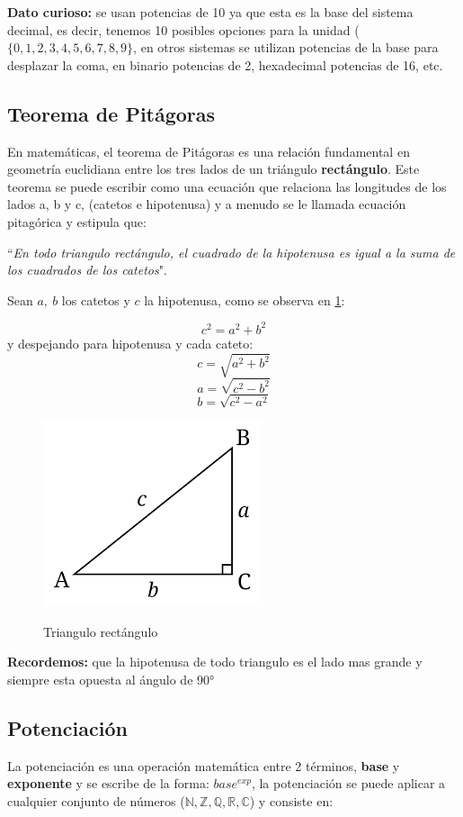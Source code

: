 \documentclass[12pt]{article}
\newcommand{\comillas}[1]{``#1"}
\begin{document}
    \textbf{Dato curioso:} se usan potencias de 10 ya que esta es la base del
    sistema decimal, es decir, tenemos 10 posibles opciones para la unidad
    ($\{0,1,2,3,4,5,6,7,8,9\}$, en otros sistemas se utilizan potencias de la base
    para desplazar la coma, en binario potencias de 2, hexadecimal potencias de 16,
    etc.

\newpage
\subsection{Teorema de Pitágoras}
    En matemáticas, el teorema de Pitágoras es una relación fundamental en
    geometría euclidiana entre los tres lados de un triángulo \textbf{rectángulo}.
    Este teorema se puede escribir como una ecuación que relaciona las longitudes
    de los lados a, b y c, (catetos e hipotenusa) y a menudo se le  llamada ecuación
    pitagórica y estipula que:

    \comillas{\emph{En todo triangulo rectángulo, el cuadrado de la hipotenusa es
    igual a la suma de los cuadrados de los catetos}}.

    Sean $a,\ b$ los catetos y $c$ la hipotenusa, como se observa en \ref{triangulo}:

    $$c^2 = a^2+b^2$$
    y despejando para hipotenusa y cada cateto:
    $$c= \sqrt{a^2+b^2}$$
    $$a=\sqrt{c^2-b^2}$$
    $$b= \sqrt{c^2-a^2}$$


    \begin{figure}[htb]
		\centering
        \caption{Triangulo rectángulo}
		\includegraphics{../images/triangulo.png}
		\label{triangulo}
	\end{figure}

    \textbf{Recordemos:} que la hipotenusa de todo triangulo es el lado mas grande
    y siempre esta opuesta al ángulo de 90°


\newpage
\subsection{Potenciación}
    La potenciación es una operación matemática entre 2 términos, \textbf{base}
    y \textbf{exponente} y se escribe de la forma: $base^{exp}$, la potenciación
    se puede aplicar a cualquier conjunto de números ($\mathbb{N}, \mathbb{Z},
    \mathbb{Q}, \mathbb{R}, \mathbb{C}$) y consiste en:
\end{document}

